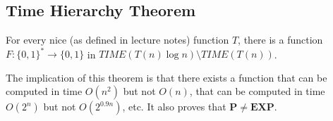\documentclass[11pt]{article}
\theoremstyle{definition}
\theoremstyle{remark}
\begin{document}
\subsection{Time Hierarchy Theorem} 

For every nice (as defined in lecture notes) function $T$, there is a function $F:\{0,1\}^* \rightarrow \{0,1\}$ in $TIME(T(n) \log n) \setminus TIME(T(n))$.

The implication of this theorem is that there exists a function that can be computed in time $O(n^2)$ but not $O(n)$, that can be computed in time $O(2^n)$ but not $O(2^{0.9n})$, etc. It also proves that $\mathbf{P} \neq \mathbf{EXP}$. 
\end{document}
